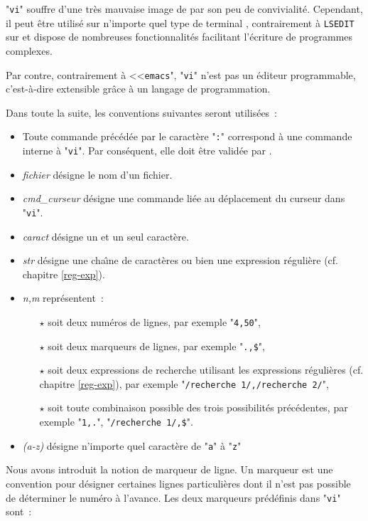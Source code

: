 "{\tt vi}" souffre d'une tr{\`e}s mauvaise image de par son peu de
convivialit{\'e}. Cependant, il peut {\^e}tre utilis{\'e} sur n'importe
quel type de terminal {\ASCII}, contrairement {\`a} {\tt LSEDIT} sur
{\OpenVMS} et dispose de nombreuses fonctionnalit{\'e}s facilitant
l'{\'e}criture de programmes complexes.

Par contre, contrairement {\`a} <<{\tt emacs}", "{\tt vi}" n'est
pas un {\'e}diteur programmable, c'est-{\`a}-dire extensible gr{\^a}ce
{\`a} un langage de programmation.

Dans toute la suite, les conventions suivantes seront utilis{\'e}es~:
\begin{itemize}
	\item	Toute commande pr{\'e}c{\'e}d{\'e}e par le caract{\`e}re
			"{\tt :}" correspond {\`a} une commande interne {\`a}
			"{\tt vi}". Par cons{\'e}quent, elle doit {\^e}tre valid{\'e}e
			par {\returnkey}.
	\item	{\sl fichier} d{\'e}signe le nom d'un fichier.
	\item	{\sl cmd\_curseur} d{\'e}signe une commande li{\'e}e au
			d{\'e}placement du curseur dans "{\tt vi}".
	\item	{\sl caract} d{\'e}signe un et un seul caract{\`e}re.
	\item	{\sl str} d{\'e}signe une cha{\^\i}ne de caract{\`e}res ou bien
			une expression r{\'e}guli{\`e}re (cf. chapitre \ref{reg-exp}).
	\item	{\sl n,m} repr{\'e}sentent~:
		\begin{itemize}
			\item[$\star$]  soit deux num{\'e}ros de lignes,
					par exemple "\verb=4,50=",
			\item[$\star$]	soit deux marqueurs de lignes,
					par exemple "\verb=.,$=",
			\item[$\star$]	soit deux expressions de recherche utilisant
					les expressions r{\'e}guli{\`e}res (cf. chapitre \ref{reg-exp}),
					par exemple "\verb*=/recherche 1/,/recherche 2/=",
			\item[$\star$]	soit toute combinaison possible des trois
					possibilit{\'e}s pr{\'e}c{\'e}dentes, par exemple "\verb=1,.=",
					"\verb*=/recherche 1/,$=".
		\end{itemize}
	\item	{\sl (a-z)} d{\'e}signe n'importe quel caract{\`e}re de "{\tt a}" {\`a}
			"{\tt z}"
\end{itemize}

Nous avons introduit la notion de marqueur de ligne. Un marqueur est une
convention pour d{\'e}signer certaines lignes particuli{\`e}res dont il n'est pas
possible de d{\'e}terminer le num{\'e}ro {\`a} l'avance. Les deux marqueurs pr{\'e}d{\'e}finis
dans "{\tt vi}" sont~:

